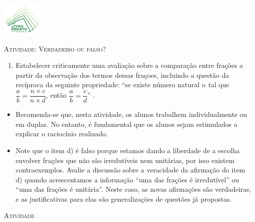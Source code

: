 \documentclass[10 pt,usenames,dvipsnames, oneside]{article}
\begin{document}
\begin{center}
  \begin{minipage}[l]{3cm}
\includegraphics[width=2cm]{../../../Figuras/logo}       
\end{minipage}\hfill
\begin{minipage}[r]{.8\textwidth}
 {\Large \scshape Atividade: Verdadeiro ou falso?}  
\end{minipage}
\end{center}
\vspace{.2cm}

\ifdefined\prof
\begin{goals}
\begin{enumerate}
\item     Estabelecer criticamente uma avaliação sobre a comparação entre
frações a partir da observação dos termos dessas fraçoes, incluindo a questão da
recíproca da seguinte propriedade:     ``se existe número natural $n$ tal que
$\dfrac{a}{b} = \dfrac{n \times c}{n \times d}$, então $\dfrac{a}{b} =
\dfrac{c}{d}$''    .
\end{enumerate}

\tcblower

\begin{itemize}
\item     Recomenda-se que, nesta atividade, os alunos trabalhem
individualmente ou em duplas. No entanto, é fundamental que os alunos sejam
estimulados a explicar o raciocínio realizado.
  \item     Note que o item d) é falso porque estamos dando a liberdade de a
escolha envolver frações que não são irredutíveis nem unitárias, por isso
existem contraexemplos. Avalie a discussão sobre a veracidade da afirmação do
item d) quando acrescentamos a informação ``uma das frações é irredutível'' ou
``uma das frações é unitária''. Neste caso, as novas afirmações são verdadeiras,
e as justificativas para elas são generalizações de questões já propostas.
\end{itemize}
\end{goals}

\bigskip
\begin{center}
{\large \scshape Atividade}
\end{center}
\fi
\end{document}

